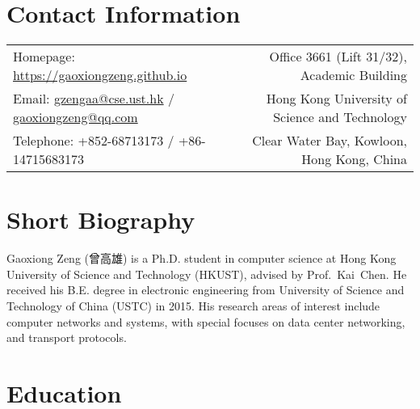 \documentclass[10pt,a4paper,roman]{moderncv} %
\begin{document}
\makecvtitle %

\section{Contact Information}
\vspace{2mm}
\begin{tabular}{p{} r}
Homepage: \textcolor{blue}{\url{https://gaoxiongzeng.github.io}} & Office 3661 (Lift 31/32), Academic Building\\
Email: \href{mailto:gzengaa@cse.ust.hk}{gzengaa@cse.ust.hk}  / \href{mailto:gaoxiongzeng@qq.com}{gaoxiongzeng@qq.com} &  Hong Kong University of Science and Technology\\
Telephone: +852-68713173 / +86-14715683173 & Clear Water Bay, Kowloon, Hong Kong, China\\
\end{tabular}


\section{Short Biography}
\vspace{2mm}
Gaoxiong Zeng (曾高雄) is a Ph.D. student in computer science at Hong Kong University of Science and Technology (HKUST), advised by Prof.~Kai~Chen. He received his B.E. degree in electronic engineering from University of Science and Technology of China (USTC) in 2015. His research areas of interest include computer networks and systems, with special focuses on data center networking, and transport protocols.

\section{Education}
\vspace{2mm}
\vspace{2mm}
\end{document}
